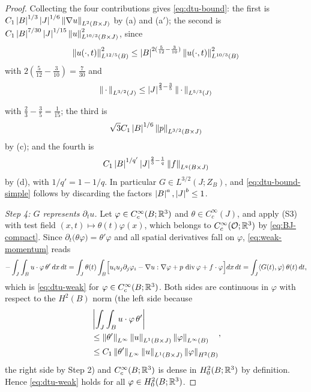 \documentclass[11pt,reqno]{amsart}
\begin{document}
\begin{proof}
Collecting the four contributions gives \eqref{eq:dtu-bound}: the first is
$C_{1}\left\lvert B \right\rvert^{1/3}\left\lvert J \right\rvert^{1/6}\left\lVert \nabla u \right\rVert_{L^{2}(B\times J)}$ by (a) and
(a$'$); the second is
$C_{1}\left\lvert B \right\rvert^{7/30}\left\lvert J \right\rvert^{1/15}\left\lVert u \right\rVert^{2}_{L^{10/3}(B\times J)}$, since
\[
\left\lVert u(\cdot,t) \right\rVert^{2}_{L^{12/5}(B)}\le\left\lvert B \right\rvert^{2(\frac5{12}-\frac3{10})}
 \left\lVert u(\cdot,t) \right\rVert^{2}_{L^{10/3}(B)}
\]
 with $2(\tfrac5{12}-\tfrac3{10})=\tfrac7{30}$
and
\[
\left\lVert \,\cdot\, \right\rVert_{L^{3/2}(J)}\le\left\lvert J \right\rvert^{\frac23-\frac35}\left\lVert \,\cdot\, \right\rVert_{L^{5/3}(J)}
\]

with $\tfrac23-\tfrac35=\tfrac1{15}$; the third is
\[
\sqrt{3}C_{1}\left\lvert B \right\rvert^{1/6}\left\lVert p \right\rVert_{L^{3/2}(B\times J)}
\]
 by (c); and the fourth is
\[
C_{1}\left\lvert B \right\rvert^{1/q'}\left\lvert J \right\rvert^{\frac23-\frac1q}\left\lVert f \right\rVert_{L^{q}(B\times J)}
\]
 by (d),
with $1/q'=1-1/q$. In particular $G\in L^{3/2}(J;Z_{B})$, and
\eqref{eq:dtu-bound-simple} follows by discarding the factors
$\left\lvert B \right\rvert^{a},\left\lvert J \right\rvert^{b}\le1$.

\emph{Step 4: $G$ represents $\partial_{t}u$.} Let
$\varphi\in C_{c}^{\infty}(B;\mathbb{R}^{3})$ and $\theta\in C_{c}^{\infty}(J)$, and
apply (S3) with test field $(x,t)\mapsto\theta(t)\varphi(x)$, which belongs to
$C^{\infty}_{c}(\mathcal{O};\mathbb{R}^{3})$ by \eqref{eq:BJ-compact}. Since
$\partial_{t}\bigl(\theta\varphi\bigr)=\theta'\varphi$ and all spatial
derivatives fall on $\varphi$, \eqref{eq:weak-momentum} reads
\[
  -\int_{J}\int_{B}u\cdot\varphi\,\theta'\,dx\,dt
  =\int_{J}\theta(t)\int_{B}\Bigl[u_{i}u_{j}\partial_{j}\varphi_{i}
     -\nabla u:\nabla\varphi+p\,\operatorname{div}\varphi+f\cdot\varphi\Bigr]dx\,dt
  =\int_{J}\langle G(t),\varphi\rangle\,\theta(t)\,dt ,
\]
which is \eqref{eq:dtu-weak} for $\varphi\in C_{c}^{\infty}(B;\mathbb{R}^{3})$. Both
sides are continuous in $\varphi$ with respect to the $H^{2}(B)$ norm (the
left side because
\[
\begin{aligned}
&\left\lvert \int_{J}\int_{B}u\cdot\varphi\,\theta' \right\rvert
\\ &\le\left\lVert \theta' \right\rVert_{L^{\infty}}\left\lVert u \right\rVert_{L^{1}(B\times J)}\left\lVert \varphi \right\rVert_{L^{\infty}(B)}
\\ &\le C_{1}\left\lVert \theta' \right\rVert_{L^{\infty}}\left\lVert u \right\rVert_{L^{1}(B\times J)}\left\lVert \varphi \right\rVert_{H^{2}(B)}
\end{aligned}
,
\]
the right side by Step 2) and $C_{c}^{\infty}(B;\mathbb{R}^{3})$ is dense in
$H^{2}_{0}(B;\mathbb{R}^{3})$ by definition. Hence \eqref{eq:dtu-weak} holds for all
$\varphi\in H^{2}_{0}(B;\mathbb{R}^{3})$.
\end{proof}
\end{document}
